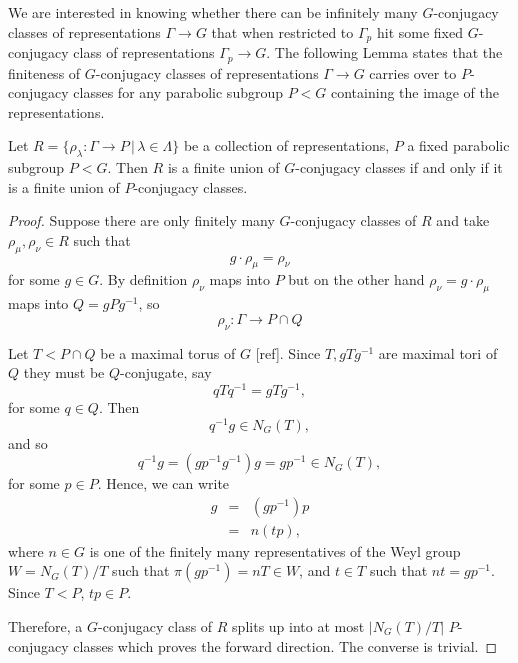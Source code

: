 We are interested in knowing whether there can be infinitely many $G$-conjugacy classes of representations $\Gamma\rightarrow G$ that when restricted to $\Gamma_p$ hit some fixed $G$-conjugacy class of representations $\Gamma_p\rightarrow G$. The following Lemma states that the finiteness of $G$-conjugacy classes of representations $\Gamma\rightarrow G$ carries over to $P$-conjugacy classes for any parabolic subgroup $P<G$ containing the image of the representations.

\begin{lemma}\label{GIsPConj} Let $R=\{\rho_\lambda:\Gamma\rightarrow P\, |\, \lambda \in \Lambda\}$ be a collection of representations, $P$ a fixed parabolic subgroup $P<G$. Then $R$ is a finite union of $G$-conjugacy classes if and only if it is a finite union of $P$-conjugacy classes.
\end{lemma}
\begin{proof}
	Suppose there are only finitely many $G$-conjugacy classes of $R$ and take $\rho_\mu, \rho_\nu \in R$ such that
	\begin{displaymath}
		g\cdot \rho_\mu = \rho_\nu
	\end{displaymath}
	for some $g \in G$. By definition $\rho_\nu$ maps into $P$ but on the other hand $\rho_\nu = g\cdot \rho_\mu$ maps into $Q = gPg^{-1}$, so 
	\begin{displaymath}
		\rho_\nu: \Gamma\rightarrow P \cap Q
	\end{displaymath}
	
	Let $T < P \cap Q$ be a maximal torus of $G$ [ref]. Since $T,gTg^{-1}$ are maximal tori of $Q$ they must be $Q$-conjugate, say
	\begin{displaymath}
		qTq^{-1} = gTg^{-1},
	\end{displaymath}
	for some $q \in Q$. Then 
	\begin{displaymath}
		q^{-1}g \in N_G(T),
	\end{displaymath}
	and so
	\begin{displaymath}
		q^{-1}g = (gp^{-1}g^{-1})g = gp^{-1} \in N_G(T),
	\end{displaymath}
	for some $p \in P$. Hence, we can write
	\begin{eqnarray*}
		g &=& (gp^{-1})p\\
		&=& n(tp),
	\end{eqnarray*}
	where $n\in G$ is one of the finitely many representatives of the Weyl group $W=N_G(T)/T$ such that $\pi(gp^{-1}) = nT\in W$, and $t\in T$ such that $nt = gp^{-1}$. Since $T<P$, $tp\in P$.
	
	Therefore, a $G$-conjugacy class of $R$ splits up into at most $|N_G(T)/T|$ $P$-conjugacy classes which proves the forward direction. The converse is trivial.
\end{proof}


